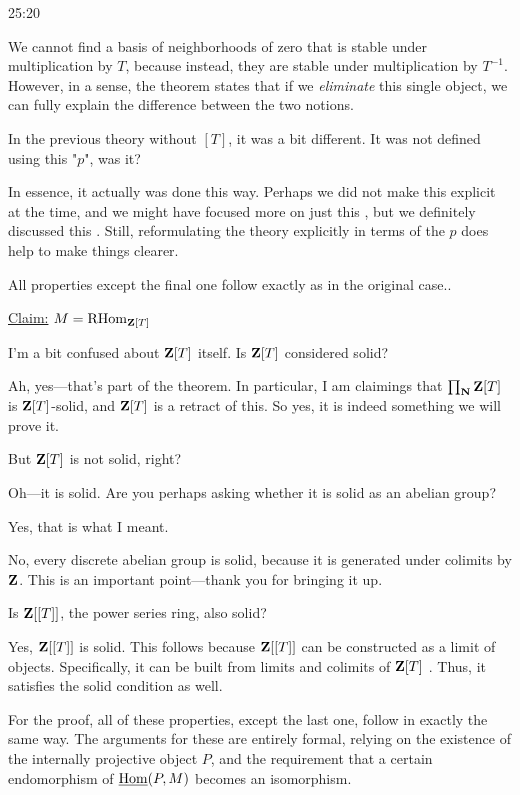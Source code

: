 \begin{unfinished}{25:20}

We cannot find a basis of neighborhoods of zero that is stable under multiplication by $T$, because instead, they are stable under multiplication by $T^{-1}$. However, in a sense, the theorem states that if we \emph{eliminate} this single object, we can fully explain the difference between the two notions.

\ques In the previous theory without $[T]$, it was a bit different. It was not defined using this "$p$", was it?

\ans In essence, it actually was done this way. Perhaps we did not make this explicit at the time, and we might have focused more on just this , but we definitely discussed this . Still, 
reformulating the theory explicitly in terms of the $p$ does help to make things clearer.

\begin{sketch}
All properties except the final one follow exactly as in the original case..

\underline{Claim:}
$ M = \operatorname{RHom}_{\mathbf Z[T]}$

\end{sketch}

\ques I'm a bit confused about $\mathbf Z[T]$ itself. Is $\mathbf Z[T]$ considered solid? 

\ans Ah, yes---that's part of the theorem. In particular, I am claimings that $\prod_\mathbf N \mathbf Z[T]$ is $\mathbf Z[T]$-solid, and $\mathbf Z[T]$ is a retract of this. So yes, it is indeed  something we will prove it.

\ques But $\mathbf Z[T]$ is not solid, right?

\ans Oh---it is solid. Are you perhaps asking whether it is solid as an abelian group?

\ques Yes, that is what I meant.

\ans No, every discrete abelian group is solid, because it is generated under colimits by $\mathbf Z$. This is an important point---thank you for bringing it up.

\ques Is $\mathbf Z[[T]]$, the power series ring, also solid?

\ans Yes, $\mathbf Z[[T]]$ is solid. This follows because $\mathbf Z[[T]]$ can be constructed as a limit of objects. Specifically, it can be built from limits and colimits of $\mathbf Z[T]$ . Thus, it satisfies the solid condition as well.


For the proof, all of these properties, except the last one, follow in exactly the same way.
The arguments for these are entirely formal, relying on the existence of the internally projective object $P$, and the requirement that a certain endomorphism of $\operatorname{\underline{Hom}}(P,M)$ becomes an isomorphism.


\end{unfinished}
